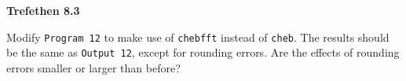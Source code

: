 \textbf{Trefethen 8.3}

Modify \texttt{Program 12} to make use of \texttt{chebfft} instead of \texttt{cheb}. The results should be the same as
\texttt{Output 12}, except for rounding errors. Are the effects of rounding errors smaller or larger than before?

\begin{solution}
  \ \\
  \vfill
\end{solution}